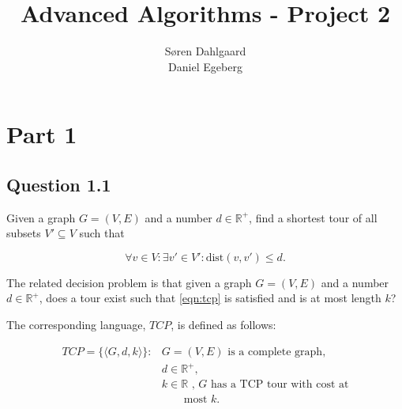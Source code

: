 \documentclass{sig-alternate}
\begin{document}
\title{Advanced Algorithms - Project 2}


\author{
\alignauthor
Søren Dahlgaard\\
\alignauthor
Daniel Egeberg\\
}

\maketitle

\section*{Part 1}
\subsection*{Question 1.1}

Given a graph $G=(V,E)$ and a number $d \in \mathbb{R}^+$, find a shortest
tour of all subsets $V'\subseteq V$ such that

\begin{equation}
    \label{eqn:tcp}
    \forall v \in V : \exists v' \in V' : \text{dist}(v,v') \leq d.
\end{equation}

The related decision problem is that given a graph $G=(V,E)$ and a number $d
\in \mathbb{R}^+$, does a tour exist such that \autoref{eqn:tcp} is satisfied
and is at most length $k$?

The corresponding language, $TCP$, is defined as follows:

\begin{align*}
    TCP = \{\langle G, d, k \rangle\} :& G = (V,E) \text{ is a complete graph,} \\
        & d \in \mathbb{R}^+, \\
        & k \in \mathbb{R} \text{ , $G$ has a TCP tour with cost at} \\
        & \qquad \text{most $k$.}
\end{align*}
\end{document}

